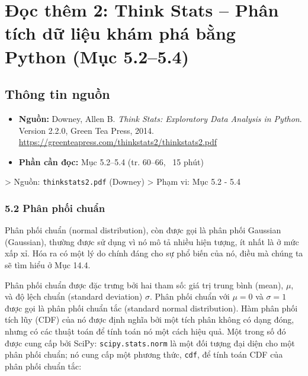 \chapter{Đọc thêm 2: Think Stats -- Phân tích dữ liệu khám phá bằng Python (Mục 5.2--5.4)}
\label{ch:M2L2-reading2}


\section{Thông tin nguồn}

\begin{itemize}
  \item \textbf{Nguồn:} Downey, Allen B. \emph{Think Stats: Exploratory Data Analysis in Python}. Version 2.2.0, Green Tea Press, 2014. \url{https://greenteapress.com/thinkstats2/thinkstats2.pdf}
  \item \textbf{Phần cần đọc:} Mục 5.2--5.4 (tr. 60--66, ~15 phút)
\end{itemize}

> Nguồn: \texttt{thinkstats2.pdf} (Downey) > Phạm vi: Mục 5.2 - 5.4

\subsection*{5.2 Phân phối chuẩn}

Phân phối chuẩn (normal distribution), còn được gọi là phân phối Gaussian (Gaussian), thường được sử dụng vì nó mô tả nhiều hiện tượng, ít nhất là ở mức xấp xỉ. Hóa ra có một lý do chính đáng cho sự phổ biến của nó, điều mà chúng ta sẽ tìm hiểu ở Mục 14.4.

Phân phối chuẩn được đặc trưng bởi hai tham số: giá trị trung bình (mean), $\mu$, và độ lệch chuẩn (standard deviation) $\sigma$. Phân phối chuẩn với $\mu = 0$ và $\sigma = 1$ được gọi là phân phối chuẩn tắc (standard normal distribution). Hàm phân phối tích lũy (CDF) của nó được định nghĩa bởi một tích phân không có dạng đóng, nhưng có các thuật toán để tính toán nó một cách hiệu quả. Một trong số đó được cung cấp bởi SciPy: \texttt{scipy.stats.norm} là một đối tượng đại diện cho một phân phối chuẩn; nó cung cấp một phương thức, \texttt{cdf}, để tính toán CDF của phân phối chuẩn tắc:

